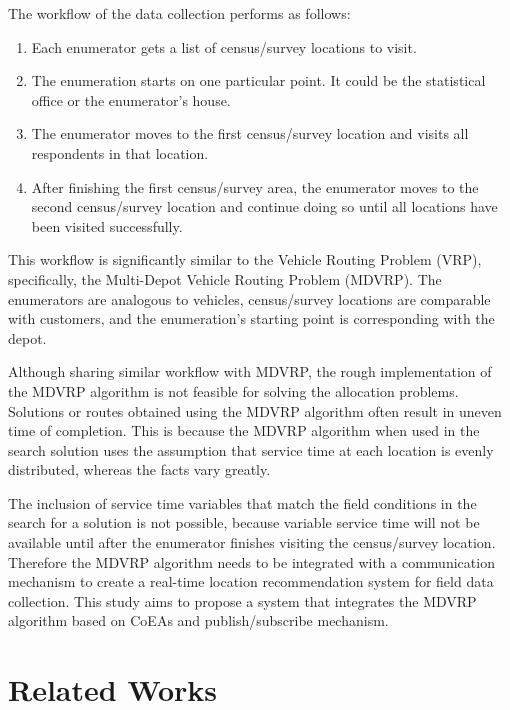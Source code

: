 \documentclass[conference]{IEEEtran}
\begin{document}
The workflow of the data collection performs as follows: 
\begin{enumerate}
	\item Each enumerator gets a list of census/survey locations to visit. 
	\item The enumeration starts on one particular point. It could be the statistical office or the enumerator's house. 
	\item The enumerator moves to the first census/survey location and visits all respondents in that location. 
	\item After finishing the first census/survey area, the enumerator moves to the second census/survey location and continue doing so until all locations have been visited successfully.
\end{enumerate}
This workflow is significantly similar to the Vehicle Routing Problem (VRP), specifically, the Multi-Depot Vehicle Routing Problem (MDVRP). The enumerators are analogous to vehicles, census/survey locations are comparable with customers, and the enumeration's starting point is corresponding with the depot. 

Although sharing similar workflow with MDVRP, the rough implementation of the MDVRP algorithm is not feasible for solving the allocation problems. Solutions or routes obtained using the MDVRP algorithm often result in uneven time of completion. This is because the MDVRP algorithm when used in the search solution uses the assumption that service time at each location is evenly distributed, whereas the facts vary greatly.

The inclusion of service time variables that match the field conditions in the search for a solution is not possible, because variable service time will not be available until after the enumerator finishes visiting the census/survey location. Therefore the MDVRP algorithm needs to be integrated with a communication mechanism to create a real-time location recommendation system for field data collection. This study aims to propose a system that integrates the MDVRP algorithm based on CoEAs and publish/subscribe mechanism. 


\section{Related Works}
\label{sec:related-works}
\end{document}
